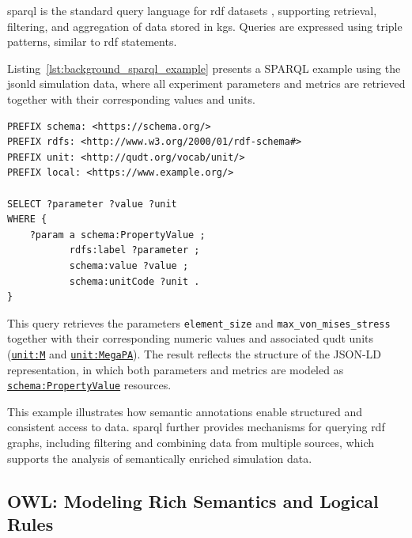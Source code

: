 \gls{sparql} is the standard query language for \gls{rdf} datasets \cite{sparql_standard}, supporting retrieval, filtering, and aggregation of data stored in \glspl{kg}. Queries are expressed using triple patterns, similar to \gls{rdf} statements.

Listing~\ref{lst:background_sparql_example} presents a SPARQL example using the \gls{jsonld} simulation data, where all experiment parameters and metrics are retrieved together with their corresponding values and units.

\begin{lstlisting}[float=htbp,style=sparql, caption={SPARQL query retrieving parameter values and units}, label={lst:background_sparql_example}]
PREFIX schema: <https://schema.org/>
PREFIX rdfs: <http://www.w3.org/2000/01/rdf-schema#>
PREFIX unit: <http://qudt.org/vocab/unit/>
PREFIX local: <https://www.example.org/>

SELECT ?parameter ?value ?unit
WHERE {
    ?param a schema:PropertyValue ;
           rdfs:label ?parameter ;
           schema:value ?value ;
           schema:unitCode ?unit .
}
\end{lstlisting}

This query retrieves the parameters \texttt{element\_size} and \texttt{max\_von\_mises\_stress} together with their corresponding numeric values and associated \gls{qudt} units 
(\href{https://qudt.org/vocab/unit/M}{\texttt{unit:M}} and \href{https://qudt.org/vocab/unit/MegaPA}{\texttt{unit:MegaPA}}). The result reflects the structure of the JSON-LD representation, in which both parameters and metrics are modeled as \href{https://schema.org/PropertyValue}{\texttt{schema:PropertyValue}} resources.

This example illustrates how semantic annotations enable structured and consistent access to data. 
\gls{sparql} further provides mechanisms for querying \gls{rdf} graphs, including filtering and combining data from multiple sources, which supports the analysis of semantically enriched simulation data.

\newpage

\subsection{OWL: Modeling Rich Semantics and Logical Rules}
\label{sec:background:owl}

